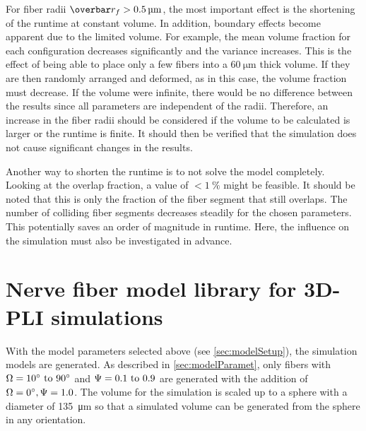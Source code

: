 %
For fiber radii $\fiberRadiusMean > \SI{0.5}{\micro\meter}$, the most important effect is the shortening of the runtime at constant volume.
In addition, boundary effects become apparent due to the limited volume.
For example, the mean volume fraction for each configuration decreases significantly and the variance increases.
This is the effect of being able to place only a few fibers into a $\SI{60}{\micro\meter}$ thick volume.
If they are then randomly arranged and deformed, as in this case, the volume fraction must decrease.
If the volume were infinite, there would be no difference between the results since all parameters are independent of the radii.
Therefore, an increase in the fiber radii should be considered if the volume to be calculated is larger or the runtime is finite.
It should then be verified that the simulation does not cause significant changes in the results.
\par
%
Another way to shorten the runtime is to not solve the model completely.
Looking at the overlap fraction, a value of $<\SI{1}{\percent}$ might be feasible.
It should be noted that this is only the fraction of the fiber segment that still overlaps.
The number of colliding fiber segments decreases steadily for the chosen parameters.
This potentially saves an order of magnitude in runtime.
Here, the influence on the simulation must also be investigated in advance.
% 
%
%
\section{Nerve fiber model library for \acs{3D-PLI} simulations}
\label{sec:genNerveFiberLibrary}
%
With the model parameters selected above (see \cref{sec:modelSetup}), the simulation models are generated.
As described in \cref{sec:modelParamet}, only fibers with $\modelOmega = \SIrange{10}{90}{\degree}$ and $\modelPsi = \SIrange{0.1}{0.9}{}$ are generated with the addition of $\textnormal{$\Omega$}=\SI{0}{\degree}, \textnormal{$\Psi$}=\SI{1.0}{}$.
The volume for the simulation is scaled up to a sphere with a diameter of \SI{135}{\micro\meter} so that a simulated volume can be generated from the sphere in any orientation.
% 
%
%
